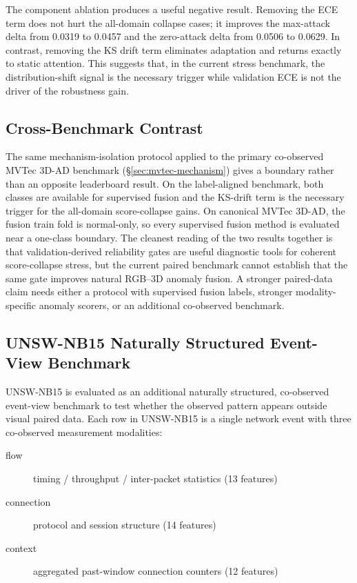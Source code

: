 \documentclass[10pt,conference]{IEEEtran}
\begin{document}
The component ablation produces a useful negative result. Removing the ECE term
does not hurt the all-domain collapse cases; it improves the max-attack delta
from 0.0319 to 0.0457 and the zero-attack delta from 0.0506 to 0.0629. In
contrast, removing the KS drift term eliminates adaptation and returns exactly
to static attention. This suggests that, in the current stress benchmark, the
distribution-shift signal is the necessary trigger while validation ECE is not
the driver of the robustness gain.

\subsection{Cross-Benchmark Contrast}
The same mechanism-isolation protocol applied to the primary co-observed
MVTec 3D-AD benchmark (§\ref{sec:mvtec-mechanism}) gives a boundary rather than
an opposite leaderboard result. On the label-aligned benchmark, both classes are
available for supervised fusion and the KS-drift term is the necessary trigger
for the all-domain score-collapse gains. On canonical MVTec 3D-AD, the fusion
train fold is normal-only, so every supervised fusion method is evaluated near a
one-class boundary. The cleanest reading of the two results together is that
validation-derived reliability gates are useful diagnostic tools for coherent
score-collapse stress, but the current paired benchmark cannot establish that
the same gate improves natural RGB--3D anomaly fusion. A stronger paired-data
claim needs either a protocol with supervised fusion labels, stronger
modality-specific anomaly scorers, or an additional co-observed benchmark.

\subsection{UNSW-NB15 Naturally Structured Event-View Benchmark}
\label{sec:unsw-paired}

UNSW-NB15 is evaluated as an additional naturally structured,
co-observed event-view benchmark to test whether the observed pattern
appears outside visual paired data. Each row in UNSW-NB15 is a single
network event with three co-observed measurement modalities:

\begin{description}
  \item[flow] timing / throughput / inter-packet statistics (13 features)
  \item[connection] protocol and session structure (14 features)
  \item[context] aggregated past-window connection counters (12 features)
\end{description}
\end{document}
